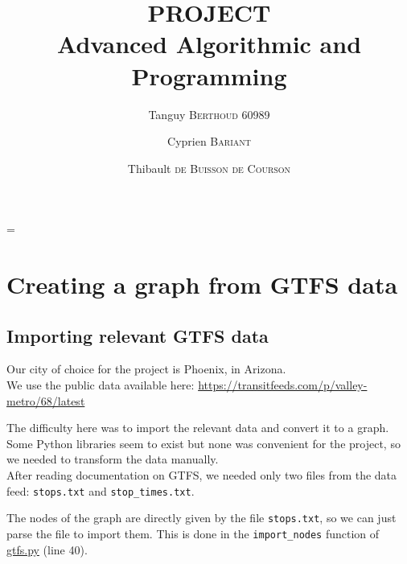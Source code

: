 \documentclass[12pt,english]{article}
\author{
	Tanguy \textsc{Berthoud} 60989\and
	Cyprien \textsc{Bariant}\and %
	Thibault \textsc{de Buisson de Courson} %
}
\title{
	\textbf{PROJECT}\\
	Advanced Algorithmic and Programming
}
\makeatletter
\let\old@tableofcontents\tableofcontents
\renewcommand*\tableofcontents{
		\newpage
		\old@tableofcontents%
		\newpage
	}
\makeatother
\begin{document}
	\maketitle
	\tableofcontents
	\parskip=\baselineskip%

	\section{Creating a graph from GTFS data}\label{sec:step:1}
	\subsection{Importing relevant GTFS data}\label{sec:step:1.1}

	Our city of choice for the project is Phoenix, in Arizona.\\
	We use the public data available here: \url{https://transitfeeds.com/p/valley-metro/68/latest}

	The difficulty here was to import the relevant data and convert it to a graph.
	Some Python libraries seem to exist but none was convenient for the project, so we needed to transform the data manually.\\
	After reading documentation on GTFS, we needed only two files from the data feed: \texttt{stops.txt} and \texttt{stop\_times.txt}.

	\begin{center}
	\end{center}

	The nodes of the graph are directly given by the file \texttt{stops.txt}, so we can just parse the file to import them.
	This is done in the \texttt{import\_nodes} function of \hyperref[sec:code:gtfs]{\ttfamily gtfs.py} (line 40).
\end{document}
